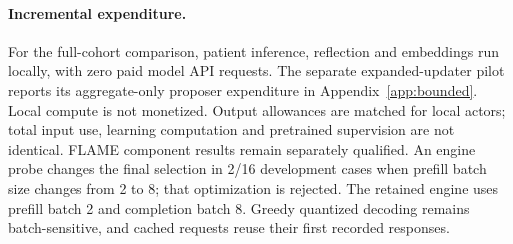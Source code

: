 \paragraph{Incremental expenditure.}
For the full-cohort comparison, patient inference, reflection and embeddings run locally, with zero paid model API requests. The separate expanded-updater pilot reports its aggregate-only proposer expenditure in Appendix~\ref{app:bounded}. Local compute is not monetized. Output allowances are matched for local actors; total input use, learning computation and pretrained supervision are not identical. FLAME component results remain separately qualified. An engine probe changes the final selection in 2/16 development cases when prefill batch size changes from 2 to 8; that optimization is rejected. The retained engine uses prefill batch 2 and completion batch 8. Greedy quantized decoding remains batch-sensitive, and cached requests reuse their first recorded responses.

